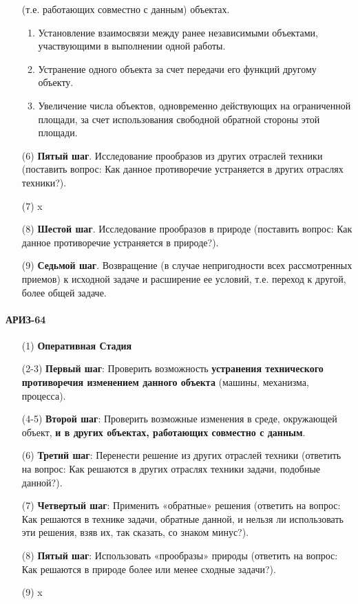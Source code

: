 \documentclass[11pt,a4paper]{article}
\begin{document}
\begin{itemize}
  (т.е. работающих совместно с данным) объектах.
  \begin{enumerate}
  \item Установление взаимосвязи между ранее независимыми объектами,
    участвующими в выполнении одной работы.
  \item Устранение одного объекта за счет передачи его функций другому
    объекту.
  \item Увеличение числа объектов, одновременно действующих на ограниченной
    площади, за счет использования свободной обратной стороны этой площади.
  \end{enumerate}
\item[(6)] \textbf{Пятый шаг}. Исследование прообразов из других отраслей
  техники (поставить вопрос: Как данное противоречие устраняется в других
  отраслях техники?).
\item[(7)] x 
\item[(8)] \textbf{Шестой шаг}. Исследование прообразов в природе (поставить
  вопрос: Как данное противоречие устраняется в природе?).
\item[(9)] \textbf{Седьмой шаг}. Возвращение (в случае непригодности всех
  рассмотренных приемов) к исходной задаче и расширение ее условий, т.е.
  переход к другой, более общей задаче.
\end{itemize}

\paragraph{АРИЗ-64 \cite{Altshuller1964}} 
\begin{itemize}
\item[(1)] \textbf{Оперативная Стадия}
\item[(2-3)] \textbf{Первый шаг}: Проверить возможность \textbf{устранения
  технического противоречия изменением данного объекта} (машины, механизма,
  процесса).
\item[(4-5)] \textbf{Второй шаг}: Проверить возможные изменения в среде,
  окружающей объект, \textbf{и в других объектах, работающих совместно с
    данным}.
\item[(6)] \textbf{Третий шаг}: Перенести решение из других отраслей техники
  (ответить на вопрос: Как решаются в других отраслях техники задачи, подобные
  данной?).
\item[(7)] \textbf{Четвертый шаг}: Применить «обратные» решения (ответить на
  вопрос: Как решаются в технике задачи, обратные данной, и нельзя ли
  использовать эти решения, взяв их, так сказать, со знаком минус?).
\item[(8)] \textbf{Пятый шаг}: Использовать «прообразы» природы (ответить на
  вопрос: Как решаются в природе более или менее сходные задачи?).
\item[(9)] x
\end{itemize}
\end{document}
